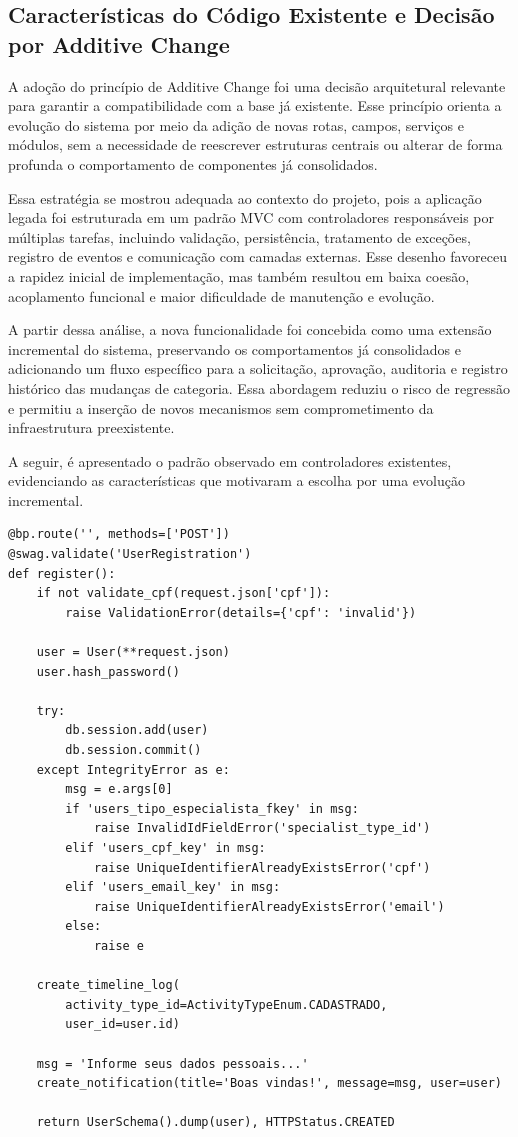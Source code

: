\subsection{Características do Código Existente e Decisão por Additive Change}
\label{sec:additive-change}
A adoção do princípio de Additive Change foi uma decisão arquitetural relevante para garantir a compatibilidade com a base já existente. Esse princípio orienta a evolução do sistema por meio da adição de novas rotas, campos, serviços e módulos, sem a necessidade de reescrever estruturas centrais ou alterar de forma profunda o comportamento de componentes já consolidados.

Essa estratégia se mostrou adequada ao contexto do projeto, pois a aplicação legada foi estruturada em um padrão MVC com controladores responsáveis por múltiplas tarefas, incluindo validação, persistência, tratamento de exceções, registro de eventos e comunicação com camadas externas. Esse desenho favoreceu a rapidez inicial de implementação, mas também resultou em baixa coesão, acoplamento funcional e maior dificuldade de manutenção e evolução.

A partir dessa análise, a nova funcionalidade foi concebida como uma extensão incremental do sistema, preservando os comportamentos já consolidados e adicionando um fluxo específico para a solicitação, aprovação, auditoria e registro histórico das mudanças de categoria. Essa abordagem reduziu o risco de regressão e permitiu a inserção de novos mecanismos sem comprometimento da infraestrutura preexistente.

A seguir, é apresentado o padrão observado em controladores existentes, evidenciando as características que motivaram a escolha por uma evolução incremental.

\begin{algorithm}[htbp]
\caption{Padrão de implementação observado em controladores existentes.}
\label{alg:legado}
\begin{verbatim}
@bp.route('', methods=['POST'])
@swag.validate('UserRegistration')
def register():
    if not validate_cpf(request.json['cpf']):
        raise ValidationError(details={'cpf': 'invalid'})

    user = User(**request.json)
    user.hash_password()

    try:
        db.session.add(user)
        db.session.commit()
    except IntegrityError as e:
        msg = e.args[0]
        if 'users_tipo_especialista_fkey' in msg:
            raise InvalidIdFieldError('specialist_type_id')
        elif 'users_cpf_key' in msg:
            raise UniqueIdentifierAlreadyExistsError('cpf')
        elif 'users_email_key' in msg:
            raise UniqueIdentifierAlreadyExistsError('email')
        else:
            raise e

    create_timeline_log(
        activity_type_id=ActivityTypeEnum.CADASTRADO,
        user_id=user.id)

    msg = 'Informe seus dados pessoais...'
    create_notification(title='Boas vindas!', message=msg, user=user)

    return UserSchema().dump(user), HTTPStatus.CREATED
\end{verbatim}
\end{algorithm}

